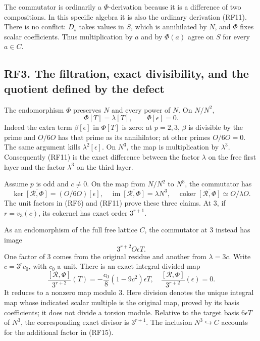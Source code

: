 \documentclass[
  10pt,
]{article}
\begin{document}
The commutator is ordinarily a \(\Phi\)-derivation because it is a
difference of two compositions. In this specific algebra it is also the
ordinary derivation (RF11). There is no conflict: \(D_s\) takes values
in \(S\), which is annihilated by \(N\), and \(\Phi\) fixes scalar
coefficients. Thus multiplication by \(a\) and by \(\Phi(a)\) agree on
\(S\) for every \(a\in C\).

\subsection{RF3. The filtration, exact divisibility, and the quotient
defined by the
defect}\label{rf3.-the-filtration-exact-divisibility-and-the-quotient-defined-by-the-defect}

The endomorphism \(\Phi\) preserves \(N\) and every power of \(N\). On
\(N/N^2\), \[
\Phi[T]=\lambda[T],\qquad \Phi[\epsilon]=0.
\tag{RF13}
\] Indeed the extra term \(\beta[\epsilon]\) in \(\Phi[T]\) is zero: at
\(p=2,3\), \(\beta\) is divisible by the prime and \(O/6O\) has that
prime as its annihilator; at other primes \(O/6O=0\). The same argument
kills \(\lambda^2[\epsilon]\). On \(N^3\), the map is multiplication by
\(\lambda^3\). Consequently (RF11) is the exact difference between the
factor \(\lambda\) on the free first layer and the factor \(\lambda^3\)
on the third layer.

Assume \(p\) is odd and \(c\ne0\). On the map from \(N/N^2\) to \(N^3\),
the commutator has \[
\ker\overline{[\mathcal R,\Phi]}=(O/6O)[\epsilon],\quad
\operatorname{im}\overline{[\mathcal R,\Phi]}=\lambda N^3,\quad
\operatorname{coker}\overline{[\mathcal R,\Phi]}\simeq O/\lambda O.
\tag{RF14}
\] The unit factors in (RF6) and (RF11) prove these three claims. At 3,
if \(r=v_3(c)\), its cokernel has exact order \(3^{r+1}\).

As an endomorphism of the full free lattice \(C\), the commutator at 3
instead has image \[
3^{r+2}O\epsilon T.
\tag{RF15}
\] One factor of 3 comes from the original residue and another from
\(\lambda=3c\). Write \(c=3^rc_0\), with \(c_0\) a unit. There is an
exact integral divided map \[
\frac{[\mathcal R,\Phi]}{3^{r+2}}(T)
=-\frac{c_0}{8}(1-9c^2)\epsilon T,
\quad
\frac{[\mathcal R,\Phi]}{3^{r+2}}(\epsilon)=0.
\tag{RF16}
\] It reduces to a nonzero map modulo 3. Here division denotes the
unique integral map whose indicated scalar multiple is the original map,
proved by its basis coefficients; it does not divide a torsion module.
Relative to the target basis \(6\epsilon T\) of \(N^3\), the
corresponding exact divisor is \(3^{r+1}\). The inclusion
\(N^3\hookrightarrow C\) accounts for the additional factor in (RF15).
\end{document}
